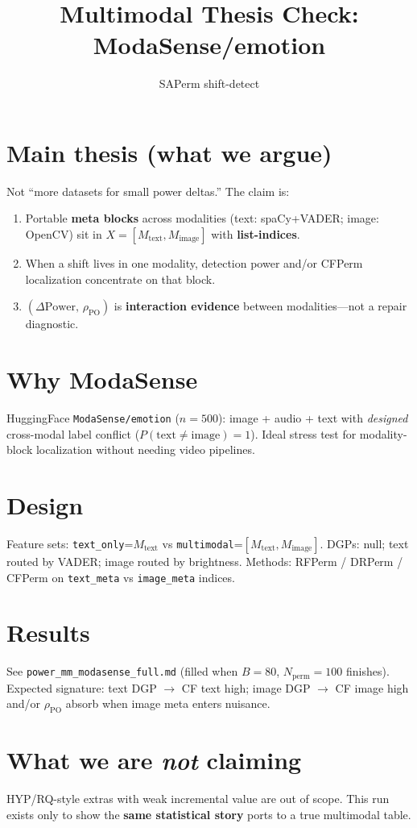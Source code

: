 \documentclass[11pt]{article}
\title{Multimodal Thesis Check: ModaSense/emotion}
\author{SAPerm shift-detect}
\date{}
\begin{document}
\maketitle

\section{Main thesis (what we argue)}
Not ``more datasets for small power deltas.''
The claim is:
\begin{enumerate}
  \item Portable \textbf{meta blocks} across modalities
        (text: spaCy+VADER; image: OpenCV) sit in
        $X=[M_{\mathrm{text}},M_{\mathrm{image}}]$ with
        \textbf{list-indices}.
  \item When a shift lives in one modality, detection power and/or
        CFPerm localization concentrate on that block.
  \item $(\Delta\mathrm{Power},\,\rho_{\mathrm{PO}})$ is
        \textbf{interaction evidence} between modalities---not a
        repair diagnostic.
\end{enumerate}

\section{Why ModaSense}
HuggingFace \texttt{ModaSense/emotion} ($n{=}500$): image + audio + text
with \emph{designed} cross-modal label conflict
($P(\mathrm{text}\neq\mathrm{image})=1$).
Ideal stress test for modality-block localization without needing
video pipelines.

\section{Design}
Feature sets: \texttt{text\_only}=$M_{\mathrm{text}}$ vs
\texttt{multimodal}=$[M_{\mathrm{text}},M_{\mathrm{image}}]$.
DGPs: null; text routed by VADER; image routed by brightness.
Methods: RFPerm / DRPerm / CFPerm on \texttt{text\_meta} vs
\texttt{image\_meta} indices.

\section{Results}
See \texttt{power\_mm\_modasense\_full.md} (filled when $B{=}80$,
$N_{\mathrm{perm}}{=}100$ finishes). Expected signature:
text DGP $\to$ CF text high; image DGP $\to$ CF image high and/or
$\rho_{\mathrm{PO}}$ absorb when image meta enters nuisance.

\section{What we are \emph{not} claiming}
HYP/RQ-style extras with weak incremental value are out of scope.
This run exists only to show the \textbf{same statistical story}
ports to a true multimodal table.
\end{document}
